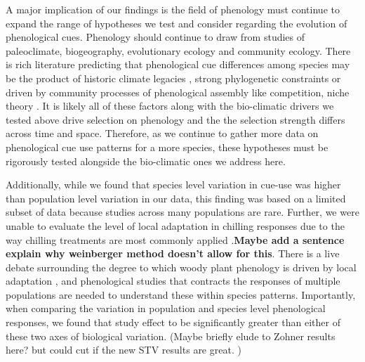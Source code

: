 \documentclass[12pt]{article}
\begin{document}
A major implication of our findings is the field of phenology must continue to expand the range of hypotheses we test and consider regarding the evolution of phenological cues. Phenology should continue to draw from studies of paleoclimate, biogeography, evolutionary ecology and community ecology. There is rich literature predicting that phenological cue differences among species may be the product of historic climate legacies \citep{}, strong phylogenetic constraints \citep{} or driven by community processes of phenological assembly like competition, niche theory  \citep{}. It is likely all of these factors along with the bio-climatic drivers we tested above drive selection on phenology and the the selection strength differs across time and space. Therefore, as we continue to gather more data on phenological cue use patterns for a more species, these hypotheses must be rigorously tested alongside the bio-climatic ones we address here.

\noindent Additionally, while we found that species level variation in cue-use was higher than population level variation in our data, this finding was based on a limited subset of data because studies across many populations are rare. Further, we were unable to evaluate the level of local adaptation in chilling responses due to the way chilling treatments are most commonly applied \citep{}.\textbf{Maybe add a sentence explain why weinberger method doesn't allow for this}. There is a live debate surrounding the degree to which woody plant phenology is driven by local adaptation \citep{}, and phenological studies that contracts the responses of multiple populations are needed to understand these within species patterns. Importantly, when comparing the variation in population and species level phenological responses, we found that study effect to be significantly greater than either of these two axes of biological variation. (Maybe briefly elude to Zohner results here? but could cut if the new STV results are great. )
\end{document}
